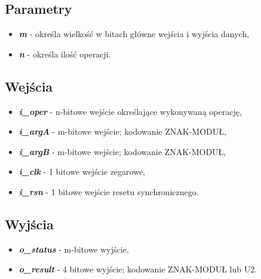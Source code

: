 \subsection{Parametry}
\begin{itemize}
	\item \emph{\textbf{m}} - określa wielkość w bitach główne wejścia i wyjścia danych,
	\item \emph{\textbf{n}} - określa ilość operacji.
\end{itemize}

\subsection{Wejścia}

\begin{itemize}
	\item \emph{\textbf{i\_oper}} - n-bitowe wejście określające wykonywaną operację,
	\item \emph{\textbf{i\_argA}} - m-bitowe wejście; kodowanie ZNAK-MODUŁ,
	\item \emph{\textbf{i\_argB}} - m-bitowe wejście; kodowanie ZNAK-MODUŁ,
	\item \emph{\textbf{i\_clk}} - 1 bitowe wejście zegarowe,
	\item \emph{\textbf{i\_rsn}} - 1 bitowe wejście resetu synchronicznego.
\end{itemize}

\subsection{Wyjścia}
\begin{itemize}
	\item \emph{\textbf{o\_status}} - m-bitowe wyjście,
	\item \emph{\textbf{o\_result}} - 4 bitowe wyjście; kodowanie ZNAK-MODUŁ lub U2.
\end{itemize}

